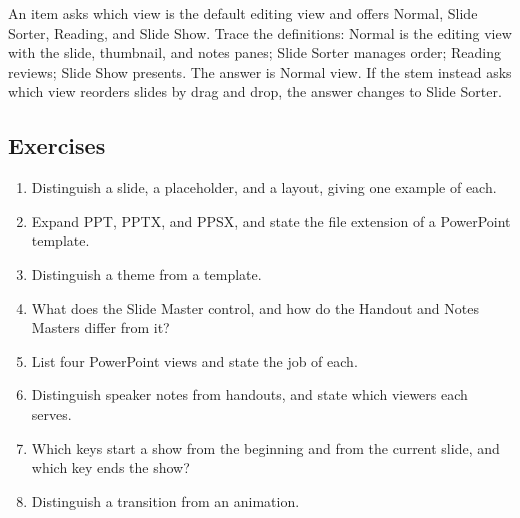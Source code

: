 \begin{example}
An item asks which view is the default editing view and offers Normal, Slide
Sorter, Reading, and Slide Show. Trace the definitions: Normal is the editing
view with the slide, thumbnail, and notes panes; Slide Sorter manages order;
Reading reviews; Slide Show presents. The answer is Normal view. If the stem
instead asks which view reorders slides by drag and drop, the answer changes
to Slide Sorter.
\end{example}

\subsection*{Exercises}
\begin{enumerate}[label=\arabic*.]
  \item Distinguish a slide, a placeholder, and a layout, giving one example
    of each.
  \item Expand PPT, PPTX, and PPSX, and state the file extension of a
    PowerPoint template.
  \item Distinguish a theme from a template.
  \item What does the Slide Master control, and how do the Handout and Notes
    Masters differ from it?
  \item List four PowerPoint views and state the job of each.
  \item Distinguish speaker notes from handouts, and state which viewers each
    serves.
  \item Which keys start a show from the beginning and from the current slide,
    and which key ends the show?
  \item Distinguish a transition from an animation.
\end{enumerate}

